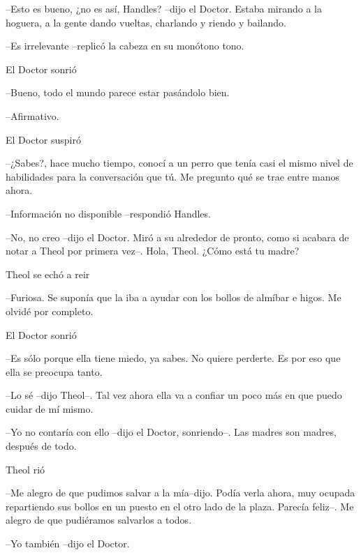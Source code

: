 --Esto es bueno, ¿no es así, Handles? --dijo el Doctor. Estaba mirando a la hoguera, a la gente dando vueltas, charlando y riendo y bailando.



--Es irrelevante --replicó la cabeza en su monótono tono.



El Doctor sonrió 

--Bueno, todo el mundo parece estar pasándolo bien.



--Afirmativo.



El Doctor suspiró 

--¿Sabes?, hace mucho tiempo, conocí a un perro que tenía casi el mismo nivel de habilidades para la conversación que tú. Me pregunto qué se trae entre manos ahora.



--Información no disponible --respondió Handles.



--No, no creo --dijo el Doctor. Miró a su alrededor de pronto, como si acabara de notar a Theol por primera vez--. Hola, Theol. ¿Cómo está tu madre?



Theol se echó a reir 

--Furiosa. Se suponía que la iba a ayudar con los bollos de almíbar e higos. Me olvidé por completo.



El Doctor sonrió 

--Es sólo porque ella tiene miedo, ya sabes. No quiere perderte. Es por eso que ella se preocupa tanto.



--Lo sé --dijo Theol--. Tal vez ahora ella va a confiar un poco más en que puedo cuidar de mí mismo.



--Yo no contaría con ello --dijo el Doctor, sonriendo--. Las madres son madres, después de todo.



Theol rió 

--Me alegro de que pudimos salvar a la mía--dijo. Podía verla ahora, muy ocupada repartiendo sus bollos en un puesto en el otro lado de la plaza. Parecía feliz--. Me alegro de que pudiéramos salvarlos a todos.



--Yo también --dijo el Doctor.



